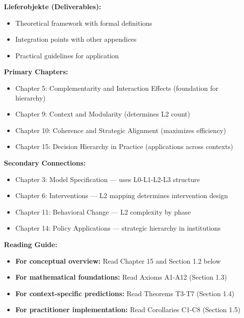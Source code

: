\begin{tcolorbox}[
    colback=orange!5!white,
    colframe=orange!75!black,
    title={\textbf{Appendix Scope: Ziel / In-Scope / Out-of-Scope / Constraints}},
    fonttitle=\bfseries
]
\textbf{Lieferobjekte (Deliverables):}
\begin{itemize}[nosep]
    \item Theoretical framework with formal definitions
    \item Integration points with other appendices
    \item Practical guidelines for application
\end{itemize}

\end{tcolorbox}


\begin{tcolorbox}[colback=purple!5!white, colframe=purple!75!black,
    title=\textbf{Chapter Linkages}]

\textbf{Primary Chapters:}
\begin{itemize}[nosep]
    \item Chapter 5: Complementarity and Interaction Effects (foundation for hierarchy)
    \item Chapter 9: Context and Modularity (determines L2 count)
    \item Chapter 10: Coherence and Strategic Alignment (maximizes efficiency)
    \item Chapter 15: Decision Hierarchy in Practice (applications across contexts)
\end{itemize}

\textbf{Secondary Connections:}
\begin{itemize}[nosep]
    \item Chapter 3: Model Specification --- uses L0-L1-L2-L3 structure
    \item Chapter 6: Interventions --- L2 mapping determines intervention design
    \item Chapter 11: Behavioral Change --- L2 complexity by phase
    \item Chapter 14: Policy Applications --- strategic hierarchy in institutions
\end{itemize}

\textbf{Reading Guide:}
\begin{itemize}[nosep]
    \item \textbf{For conceptual overview:} Read Chapter 15 and Section 1.2 below
    \item \textbf{For mathematical foundations:} Read Axioms A1-A12 (Section 1.3)
    \item \textbf{For context-specific predictions:} Read Theorems T3-T7 (Section 1.4)
    \item \textbf{For practitioner implementation:} Read Corollaries C1-C8 (Section 1.5)
\end{itemize}

\end{tcolorbox}

